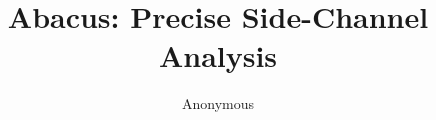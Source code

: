 \documentclass[10pt,conference]{IEEEtran}
\newcommand{\tool}{TANA}
\renewcommand{\tool}{CleverHans}
\renewcommand{\tool}{Cygne}
\renewcommand{\tool}{Do-Re-Mi}
\renewcommand{\tool}{Ta-fa Te-fe}
\renewcommand{\tool}{Ti-ri-ti-ri}
\renewcommand{\tool}{Du-Ta-De-Ta}
\renewcommand{\tool}{\textsf{Abacus}}
\begin{document}
%
\title{\tool{}: Precise Side-Channel Analysis}
\author{Anonymous}







\maketitle
\end{document}
